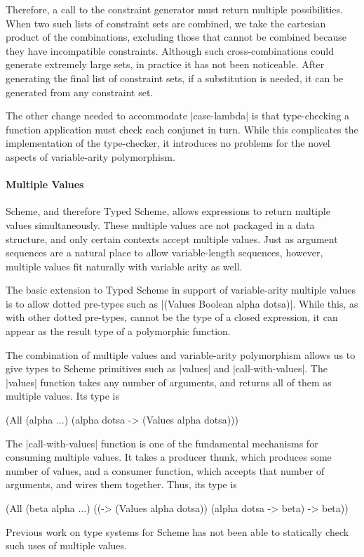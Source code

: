 \begin{schemeregion}
Therefore, a call to the constraint generator must return multiple
possibilities.  When two such lists of constraint sets are
combined, we take the cartesian product of the combinations, excluding
those that cannot be combined because they have incompatible
constraints.  Although such cross-combinations could generate extremely large sets,
in practice it has not been noticeable.  After generating the final
list of constraint sets, if a substitution is needed, it can be generated
from any constraint set.

The other change needed to accommodate \scheme|case-lambda| is that
type-checking a function application must check each conjunct in
turn.  While this complicates the implementation of the type-checker,
it introduces no problems for the novel aspects of variable-arity
polymorphism.  

\paragraph{Multiple Values}

Scheme, and therefore Typed Scheme, allows expressions to return
multiple values simultaneously.  These multiple values are not packaged in a data
structure, and only certain contexts accept
multiple values.  Just as argument sequences are a natural
place to allow variable-length sequences, however, multiple values fit
naturally with variable arity as well.  

The basic extension to Typed Scheme in support of variable-arity multiple
values is to allow dotted pre-types such as \scheme|(Values Boolean alpha
dotsa)|.  While this, as with other dotted pre-types, cannot be the type
of a closed expression, it can appear as the result type of a
polymorphic function.  

The combination of multiple values and variable-arity polymorphism
allows us to give types to Scheme primitives such as \scheme|values|
and \scheme|call-with-values|.  The \scheme|values| function takes any
number of arguments, and returns all of them as multiple values.  Its
type is
\begin{schemedisplay}
(All (alpha ...) (alpha dotsa -> (Values alpha dotsa)))
\end{schemedisplay}
  The \scheme|call-with-values| function is one of the fundamental
mechanisms for consuming multiple values.  It takes a producer thunk,
which produces some number of values, and a consumer function, which
accepts that number of arguments, and wires them together.  Thus, its type
is 
\begin{schemedisplay}
(All (beta alpha ...) ((-> (Values alpha dotsa)) (alpha dotsa -> beta) -> beta))
\end{schemedisplay}
Previous work on type systems for Scheme has not been able to
statically check such uses of multiple values.  


\end{schemeregion}
